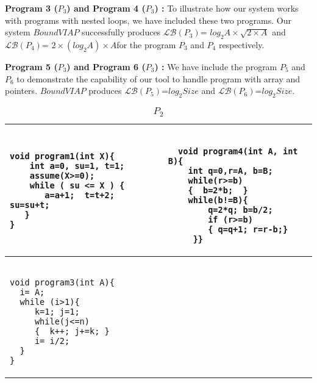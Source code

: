 \documentclass{article}
\begin{document}
\textbf{Program 3 ($P_3$) and Program 4 ($P_3$)  : } To illustrate how our system works with programs with nested loops, we have included these two programs. Our system $BoundVIAP$ successfully  produces $\mathcal{LB}(P_3)$= $log_{2}A \times \sqrt{2 \times A}$ and $\mathcal{LB}(P_4)$= $2 \times (log_{2}A) \times A$for the program $P_3$ and $P_4$ respectively. 

\textbf{Program 5 ($P_3$) and Program 6 ($P_3$)  : } We have include the program $P_5$ and $P_6$ to demonstrate the capability of our tool to handle program with array and pointers. $BoundVIAP$ produces $\mathcal{LB}(P_5)$=$log_{2}Size$ and $\mathcal{LB}(P_6)$=$log_{2}Size$.



\begin{table*}
\begin{tabular}{|p{2.4in}|p{2.2in}|}\hline
\begin{subtable}{.2\textwidth}
\begin{minipage}{1in}
\begin{verbatim}
void program1(int X){
    int a=0, su=1, t=1;
    assume(X>=0);
    while ( su <= X ) {
       a=a+1;  t=t+2;  su=su+t; 
   }
}
\end{verbatim}
\end{minipage}
\caption{$P_1$}
\label{Program1}
\end{subtable}
&
\begin{subtable}{.2\textwidth}
\begin{minipage}{1in}
\begin{verbatim}

  void program4(int A, int B){
    int q=0,r=A, b=B;    
   	while(r>=b)
    {  b=2*b;  }
    while(b!=B){
        q=2*q; b=b/2;
        if (r>=b) 
        { q=q+1; r=r-b;}
     }}
\end{verbatim}
\caption{$P_2$}
\label{Program2}
\end{minipage}
\end{subtable}
\\\hline
\begin{subtable}{.2\textwidth}
\begin{minipage}{1in}
\begin{verbatim}

void program3(int A){
  i= A;
  while (i>1){
     k=1; j=1;
     while(j<=n)
     {  k++; j+=k; }
     i= i/2;
  } 
}
\end{verbatim}
\end{minipage}
\end{subtable}
&
\begin{subtable}{.2\textwidth}
\begin{minipage}{1in}
\begin{verbatim}


\end{verbatim}
\end{minipage}
\end{subtable}
\end{tabular}
\end{table*}
\end{document}
